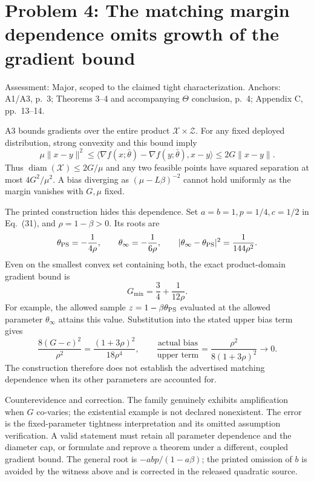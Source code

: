 \documentclass[10pt]{article}
\begin{document}
\section*{Problem 4: The matching margin dependence omits growth of the gradient bound}
Assessment: Major, scoped to the claimed tight characterization. Anchors: A1/A3, p. 3; Theorems 3–4 and accompanying \(\Theta\) conclusion, p. 4; Appendix C, pp. 13–14.\par
A3 bounds gradients over the entire product \(\mathcal X\times\mathcal Z\). For any fixed deployed distribution, strong convexity and this bound imply \[\mu\|x-y\|^2
 \le\langle\nabla f(x;\bar\theta)-\nabla f(y;\bar\theta),x-y\rangle
 \le2G\|x-y\|.\] Thus \(\operatorname{diam}(\mathcal X)\le2G/\mu\) and any two feasible points have squared separation at most \(4G^2/\mu^2\). A bias diverging as \((\mu-L\beta)^{-2}\) cannot hold uniformly as the margin vanishes with \(G,\mu\) fixed.\par
The printed construction hides this dependence. Set \(a=b=1,p=1/4,c=1/2\) in Eq. (31), and \(\rho=1-\beta>0\). Its roots are \[\theta_{\rm PS}=-\frac1{4\rho},\qquad
 \theta_\infty=-\frac1{6\rho},\qquad
 |\theta_\infty-\theta_{\rm PS}|^2=\frac1{144\rho^2}.\] Even on the smallest convex set containing both, the exact product-domain gradient bound is \[G_{\min}=\frac34+\frac1{12\rho}.\] For example, the allowed sample \(z=1-\beta\theta_{\rm PS}\) evaluated at the allowed parameter \(\theta_\infty\) attains this value. Substitution into the stated upper bias term gives \[\frac{8(G-c)^2}{\rho^2}
 =\frac{(1+3\rho)^2}{18\rho^4},\qquad
 \frac{\text{actual bias}}{\text{upper term}}
 =\frac{\rho^2}{8(1+3\rho)^2}\longrightarrow0.\] The construction therefore does not establish the advertised matching dependence when its other parameters are accounted for.\par
Counterevidence and correction. The family genuinely exhibits amplification when \(G\) co-varies; the existential example is not declared nonexistent. The error is the fixed-parameter tightness interpretation and its omitted assumption verification. A valid statement must retain all parameter dependence and the diameter cap, or formulate and reprove a theorem under a different, coupled gradient bound. The general root is \(-abp/(1-a\beta)\); the printed omission of \(b\) is avoided by the witness above and is corrected in the released quadratic source.\par
\end{document}
